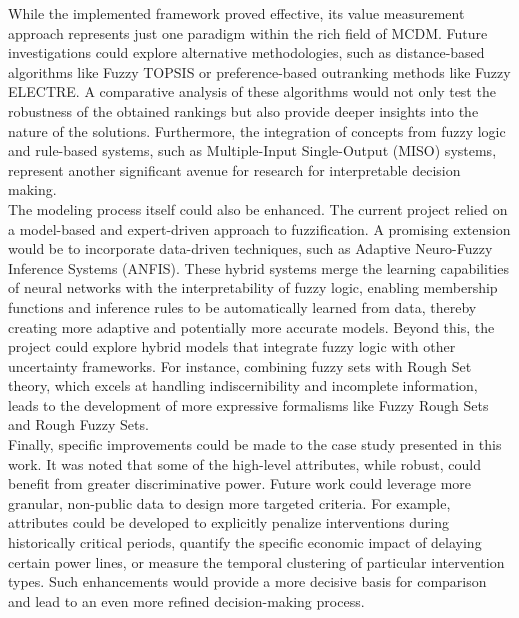 While the implemented framework proved effective, its value measurement approach represents just one paradigm within the rich field of MCDM. Future investigations could explore alternative methodologies, such as distance-based algorithms like Fuzzy TOPSIS or preference-based outranking methods like Fuzzy ELECTRE. A comparative analysis of these algorithms would not only test the robustness of the obtained rankings but also provide deeper insights into the nature of the solutions. Furthermore, the integration of concepts from fuzzy logic and rule-based systems, such as Multiple-Input Single-Output (MISO) systems, represent another significant avenue for research for interpretable decision making. \\

The modeling process itself could also be enhanced. The current project relied on a model-based and expert-driven approach to fuzzification. A promising extension would be to incorporate data-driven techniques, such as Adaptive Neuro-Fuzzy Inference Systems (ANFIS). These hybrid systems merge the learning capabilities of neural networks with the interpretability of fuzzy logic, enabling membership functions and inference rules to be automatically learned from data, thereby creating more adaptive and potentially more accurate models. Beyond this, the project could explore hybrid models that integrate fuzzy logic with other uncertainty frameworks. For instance, combining fuzzy sets with Rough Set theory, which excels at handling indiscernibility and incomplete information, leads to the development of more expressive formalisms like Fuzzy Rough Sets and Rough Fuzzy Sets.\\

Finally, specific improvements could be made to the case study presented in this work. It was noted that some of the high-level attributes, while robust, could benefit from greater discriminative power. Future work could leverage more granular, non-public data to design more targeted criteria. For example, attributes could be developed to explicitly penalize interventions during historically critical periods, quantify the specific economic impact of delaying certain power lines, or measure the temporal clustering of particular intervention types. Such enhancements would provide a more decisive basis for comparison and lead to an even more refined decision-making process.

